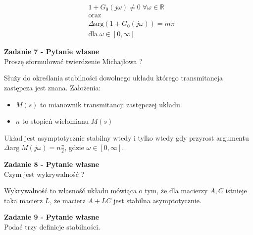 \documentclass[a4paper,11pt]{article}
\begin{document}
\begin{align*}
&1+G_{0}(j\omega) \neq 0 \; \forall \omega \in \mathbb{R} \\
&\text{oraz} \\
&\Delta \text{arg}(1+G_{0}(j\omega))=m\pi \\
&\text{dla} \; \omega \in [ 0, \infty ] 
\end{align*}
\begin{framed}
\textbf{Zadanie 7 - Pytanie własne } \\ 
Proszę sformułować twierdzenie Michajłowa ?
\end{framed}
Służy do określania stabilności dowolnego układu którego transmitancja zastępcza jest znana. 
Założenia:
\begin{itemize}
\item \( M(s) \) to mianownik transmitancji zastępczej układu.
\item \( n\) to stopień wielomianu \( M(s) \)
\end{itemize}
Układ jest asymptotycznie stabilny wtedy i tylko wtedy gdy przyrost argumentu \( \Delta \text{arg} \; M(j\omega) = n \frac{\pi}{2} \), gdzie \( \omega \in [ 0 , \infty ] \).
\begin{framed}
\textbf{Zadanie 8 - Pytanie własne } \\ 
Czym jest wykrywalność ?
\end{framed}
Wykrywalność to własność układu mówiąca o tym, że dla macierzy \(A,C\) istnieje taka macierz \(L\), że macierz \(A+LC\) jest stabilna asymptotycznie. 
\begin{framed}
\textbf{Zadanie 9 - Pytanie własne } \\ 
Podać trzy definicje stabilności.
\end{framed}
\end{document}
